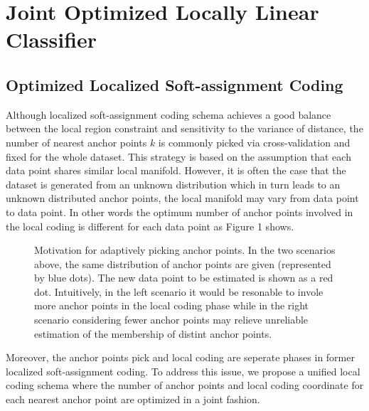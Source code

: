 \documentclass{llncs}
\begin{document}
	\section{Joint Optimized Locally Linear Classifier}
	\subsection{Optimized Localized Soft-assignment Coding}
	Although localized soft-assignment coding schema achieves a good balance between the local region constraint and sensitivity to the variance of distance, the number of nearest anchor points $k$ is commonly picked via cross-validation and fixed for the whole dataset. This strategy is based on the assumption that each data point shares similar local manifold. However, it is often the case that the dataset is generated from an unknown distribution which in turn leads to an unknown distributed anchor points, the local manifold may vary from data point to data point. In other words the optimum number of anchor points involved in the local coding is different for each data point as Figure 1 shows.
	\begin{figure}[!tbp]
		\centering
		\hfill
		\caption{Motivation for adaptively picking anchor points. In the two scenarios above, the same distribution of anchor points are given (represented by blue dots). The new data point to be estimated is shown as a red dot. Intuitively, in the left scenario it would be resonable to invole more anchor points in the local coding phase while in the right scenario considering fewer anchor points may relieve unreliable estimation of the membership of distint anchor points.}
	\end{figure}
	 Moreover, the anchor points pick and local coding are seperate phases in former localized soft-assignment coding. To address this issue, we propose a unified local coding schema where the number of anchor points and local coding coordinate for each nearest anchor point are optimized in a joint fashion.
	
\end{document}

